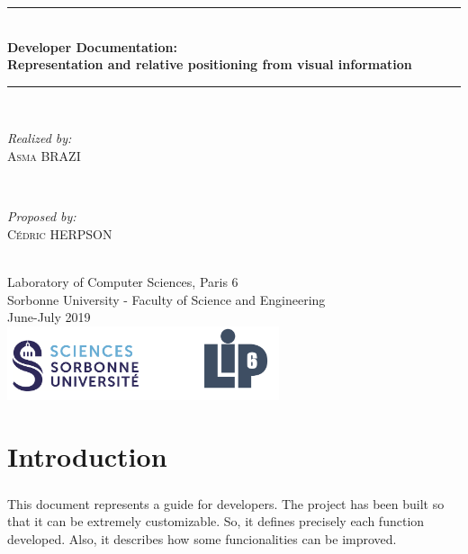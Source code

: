 \documentclass[12pt]{report}
\begin{document}
\begin{titlepage}

\newcommand{\HRule}{\rule{\linewidth}{0.5mm}} %

\center 

\HRule \\[0.4cm]
{ \huge \bfseries Developer Documentation: \\Representation and relative positioning from visual information}\\[0.4cm]
\HRule \\[1.5cm]

\begin{minipage}{0.4\textwidth}
	\begin{flushleft} \large
		\emph{Realized by:}\\
		\textsc{Asma BRAZI}
	\end{flushleft}
\end{minipage}
~
\begin{minipage}{0.4\textwidth}
	\begin{flushright} \large
		\emph{Proposed by:} \\
		\textsc{Cédric HERPSON}\\
	\end{flushright}
\end{minipage}\\[4cm]


{\large Laboratory of Computer Sciences, Paris 6 \\ Sorbonne University - Faculty of Science and Engineering}\\[3cm] 
{\large June-July 2019 }\\[3cm] 
\includegraphics[width=0.6\textwidth]{logo.png}\\[1cm] 
\vfill %

\end{titlepage}
\tableofcontents

\chapter{Introduction}
\paragraph{}
This document represents a guide for developers. The project has been built so that it can be extremely customizable. So, it defines precisely each function developed. Also, it describes how some funcionalities can be improved.
\end{document}

